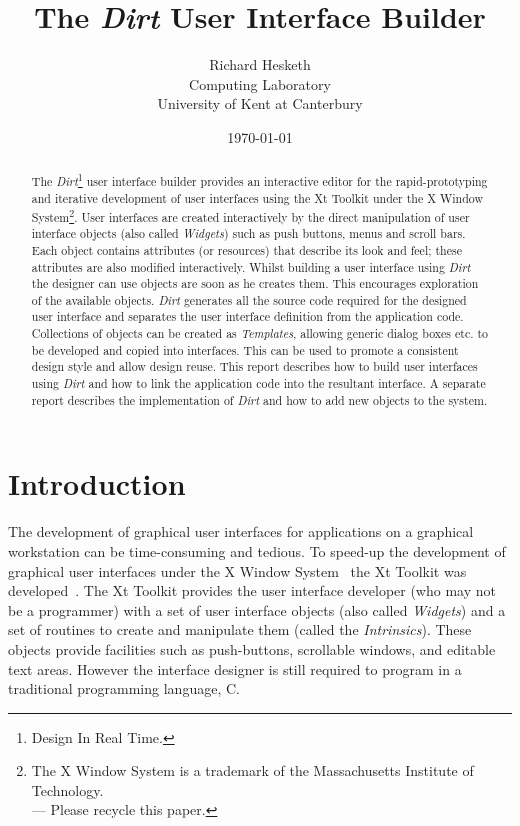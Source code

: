 

\title{The {\em Dirt} User Interface Builder}
\author{Richard Hesketh\\
Computing Laboratory\\
University of Kent at Canterbury}
\date{\today}
\maketitle

\begin{abstract}
The {\em Dirt}\footnote{
Design In Real Time.
}
user interface builder provides an interactive editor for the
rapid-prototyping and iterative development of user interfaces using the
Xt Toolkit under the X Window System\footnote{
The X Window System is a trademark of the Massachusetts Institute of
Technology.\\
 --- Please recycle this
paper.
}.  User interfaces are created interactively by the direct manipulation 
of user interface objects (also called {\em Widgets}) such as push buttons,
menus and scroll bars.  Each object contains attributes (or resources) that
describe its look and feel; these attributes are also modified interactively.
Whilst building a user interface using {\em Dirt} the designer can use
objects are soon as he creates them.  This encourages exploration of the
available objects.  {\em Dirt} generates all the source code required for
the designed user interface and separates the user interface definition from the
application code.  Collections of objects can be created as {\em Templates},
allowing generic dialog boxes {etc.} to be developed and copied into
interfaces.  This can be used to promote a consistent design style and
allow design reuse.  This report describes how to build user interfaces using
{\em Dirt} and how to link the application code into the resultant interface.
A separate report describes the implementation of {\em Dirt} and how to add
new objects to the system.  
\end{abstract}

\newpage{}
\tableofcontents{}
\listoffigures{}
\newpage{}

\section{Introduction}
The development of graphical user interfaces for applications on a graphical
workstation can be time-consuming and tedious.  To speed-up the development
of graphical user interfaces under the X Window System~\cite{X,XBible} the Xt
Toolkit was developed~\cite{XtBible}.  The Xt Toolkit provides the user
interface developer (who may not be a programmer) with a set of user
interface objects (also called {\em Widgets}) and a set of routines to create
and manipulate them (called the {\em Intrinsics}).  These objects provide
facilities such as push-buttons, scrollable windows, and editable text areas.
However the interface designer is still required to program in a traditional
programming language, C.

